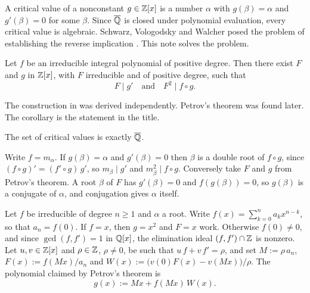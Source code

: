 
A critical value of a nonconstant $g \in \mathbb{Z}[x]$ is a number $\alpha$ with
$g(\beta) = \alpha$ and $g'(\beta) = 0$ for some $\beta$. Since $\overline{\mathbb{Q}}$ is
closed under polynomial evaluation, every critical value is algebraic.
Schwarz, Vologodsky and Walcher posed the problem of establishing the
reverse implication \cite{svw2017}.
This note solves the problem.

\begin{ptheorem}
  Let $f$ be an irreducible integral polynomial of positive degree. Then there
  exist $F$ and $g$ in $\mathbb{Z}[x]$, with $F$ irreducible and of positive degree,
  such that
  \[
    F \mid g' \quad\text{and}\quad F^{2} \mid f \circ g .
  \]
\end{ptheorem}

The construction in  was derived independently. Petrov's theorem
\cite{petrov2021} was found later.
The corollary is the statement in the title.

\begin{cor}\label{C3}
  The set of critical values is exactly $\overline{\mathbb{Q}}$.
\end{cor}

\begin{pf}
  Write $f = m_{\alpha}$. If $g(\beta) = \alpha$ and $g'(\beta) = 0$ then
  $\beta$ is a double root of $f \circ g$, since $(f \circ g)' = (f' \circ g)\,g'$,
  so $m_{\beta} \mid g'$ and $m_{\beta}^{2} \mid f \circ g$. Conversely take $F$
  and $g$ from Petrov's theorem. A root $\beta$ of $F$ has $g'(\beta) = 0$ and
  $f(g(\beta)) = 0$, so $g(\beta)$ is a conjugate of $\alpha$, and conjugation
  gives $\alpha$ itself.
\end{pf}

\label{Scons}

Let $f$ be irreducible of degree $n \geq 1$ and $\alpha$ a root. Write
$f(x) = \sum_{k=0}^{n} a_{k}x^{n-k}$, so that $a_{n} = f(0)$. If $f = x$, then
$g = x^{2}$ and $F = x$ work. Otherwise $f(0) \neq 0$, and since
$\gcd(f,f') = 1$ in $\mathbb{Q}[x]$, the elimination ideal $(f,f') \cap \mathbb{Z}$ is nonzero.
Let $u, v \in \mathbb{Z}[x]$ and $\rho \in \mathbb{Z}$, $\rho \neq 0$, be such that
$u\,f + v\,f' = \rho$, and set $M := \rho\,a_{n}$, $F(x) := f(Mx)/a_{n}$ and
$W(x) := \bigl(v(0)F(x) - v(Mx)\bigr)/\rho$. The polynomial claimed by
Petrov's theorem is
\begin{equation}\label{Eg}
  g(x) := Mx + f(Mx)\,W(x).
\end{equation}

